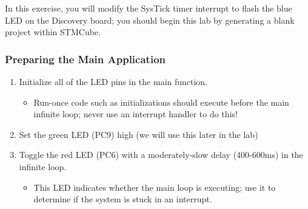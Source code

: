 \documentclass[openany,11pt,fleqn]{book} %
\begin{document}
\begin{exercise}
    \label{ex1}
    In this exercise, you will modify the SysTick timer interrupt to flash the blue LED on the Discovery board; you should begin this lab by generating a blank project within STMCube.
    
   \subsubsection{Preparing the Main Application}
   \begin{enumerate}
       \item Initialize all of the LED pins in the main function.
       \begin{itemize}
           \item Run-once code such as initializations should execute before the main infinite loop; never use an interrupt handler to do this!
       \end{itemize}
       \item Set the green LED (PC9) high (we will use this later in the lab)
       \item Toggle the red LED (PC6) with a moderately-slow delay (400-600ms) in the infinite loop.
       \begin{itemize}
           \item This LED indicates whether the main loop is executing; use it to determine if the system is stuck in an interrupt.
       \end{itemize} 
   \end{enumerate}

\end{exercise}
\end{document}
